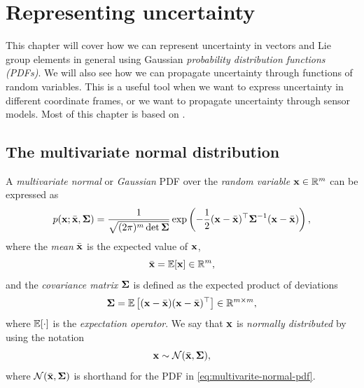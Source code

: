 \chapter{Representing uncertainty} \label{ch:uncertainty}
This chapter will cover how we can represent uncertainty in vectors and Lie group elements in general using Gaussian \emph{probability distribution functions (PDFs)}.
We will also see how we can propagate uncertainty through functions of random variables.
This is a useful tool when we want to express uncertainty in different coordinate frames, or we want to propagate uncertainty through sensor models.
Most of this chapter is based on \cite{barfoot2017state, SolaARobotics, Mangelson2020CharacterizingAlgebra}.

\section{The multivariate normal distribution}
A \emph{multivariate normal} or \emph{Gaussian} PDF over the \emph{random variable} ${\boldsymbol{\mathbf{x}}} \in {\mathbb R}^m$ can be expressed as
\begin{equation} \label{eq:multivarite-normal-pdf}
  p({\boldsymbol{\mathbf{x}}}; \bar{{\boldsymbol{\mathbf{x}}}}, {\boldsymbol{\mathbf{\Sigma}}}) = \frac{1}{\sqrt{(2\pi)^m \det {\boldsymbol{\mathbf{\Sigma}}}}} \exp \left( -\frac{1}{2} ({\boldsymbol{\mathbf{x}}} - \bar{{\boldsymbol{\mathbf{x}}}})^{\top} {\boldsymbol{\mathbf{\Sigma}}}^{-1} ({\boldsymbol{\mathbf{x}}} - \bar{{\boldsymbol{\mathbf{x}}}}) \right),
\end{equation}
where the \emph{mean} $\bar{{\boldsymbol{\mathbf{x}}}}$ is the expected value of ${\boldsymbol{\mathbf{x}}}$,
\begin{equation} \label{eq:mean-def}
  \bar{{\boldsymbol{\mathbf{x}}}} = {\mathbb E}[{\boldsymbol{\mathbf{x}}}] \in {\mathbb R}^m,
\end{equation}
and the \emph{covariance matrix} ${\boldsymbol{\mathbf{\Sigma}}}$ is defined as the expected product of deviations
\begin{equation} \label{eq:cov-def}
  {\boldsymbol{\mathbf{\Sigma}}} = {\mathbb E} \left[({\boldsymbol{\mathbf{x}}} - \bar{{\boldsymbol{\mathbf{x}}}}) ({\boldsymbol{\mathbf{x}}} - \bar{{\boldsymbol{\mathbf{x}}}})^{\top} \right] \in {\mathbb R}^{m \times m},
\end{equation}
where ${\mathbb E}[\cdot]$ is the \emph{expectation operator}.
We say that ${\boldsymbol{\mathbf{x}}}$ is \emph{normally distributed} by using the notation
\begin{equation}
  {\boldsymbol{\mathbf{x}}} \sim \mathcal{N}(\bar{{\boldsymbol{\mathbf{x}}}}, {\boldsymbol{\mathbf{\Sigma}}}),
\end{equation}
where $\mathcal{N}(\bar{{\boldsymbol{\mathbf{x}}}}, {\boldsymbol{\mathbf{\Sigma}}})$ is shorthand for the PDF in \eqref{eq:multivarite-normal-pdf}.

